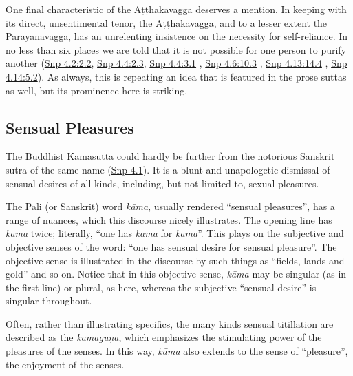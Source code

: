 \documentclass[12pt,openany]{book}%
\begin{document}
One final characteristic of the \textsanskrit{Aṭṭhakavagga} deserves a mention. In keeping with its direct, unsentimental tenor, the \textsanskrit{Aṭṭhakavagga}, and to a lesser extent the \textsanskrit{Pārāyanavagga}, has an unrelenting insistence on the necessity for self-reliance. In no less than six places we are told that it is not possible for one person to purify another (\href{https://suttacentral.net/snp4.2/en/sujato\#2.2}{Snp 4.2:2.2}, \href{https://suttacentral.net/snp4.4/en/sujato\#2.3}{Snp 4.4:2.3}, \href{https://suttacentral.net/snp4.4/en/sujato\#3.1}{Snp 4.4:3.1} , \href{https://suttacentral.net/snp4.6/en/sujato\#10.3}{Snp 4.6:10.3} , \href{https://suttacentral.net/snp4.13/en/sujato\#14.4}{Snp 4.13:14.4} , \href{https://suttacentral.net/snp4.14/en/sujato\#5.2}{Snp 4.14:5.2}). As always, this is repeating an idea that is featured in the prose suttas as well, but its prominence here is striking.

\subsection*{Sensual Pleasures}

The Buddhist \textsanskrit{Kāmasutta} could hardly be further from the notorious Sanskrit sutra of the same name (\href{https://suttacentral.net/snp4.1/en/sujato}{Snp 4.1}). It is a blunt and unapologetic dismissal of sensual desires of all kinds, including, but not limited to, sexual pleasures.

The Pali (or Sanskrit) word \textit{\textsanskrit{kāma}}, usually rendered “sensual pleasures”, has a range of nuances, which this discourse nicely illustrates. The opening line has \textit{\textsanskrit{kāma}} twice; literally, “one has \textit{\textsanskrit{kāma}} for \textit{\textsanskrit{kāma}}”. This plays on the subjective and objective senses of the word: “one has sensual desire for sensual pleasure”. The objective sense is illustrated in the discourse by such things as “fields, lands and gold” and so on. Notice that in this objective sense, \textit{\textsanskrit{kāma}} may be singular (as in the first line) or plural, as here, whereas the subjective “sensual desire” is singular throughout.

Often, rather than illustrating specifics, the many kinds sensual titillation are described as the \textit{\textsanskrit{kāmaguṇa}}, which emphasizes the stimulating power of the pleasures of the senses. In this way, \textit{\textsanskrit{kāma}} also extends to the sense of “pleasure”, the enjoyment of the senses.
\end{document}
